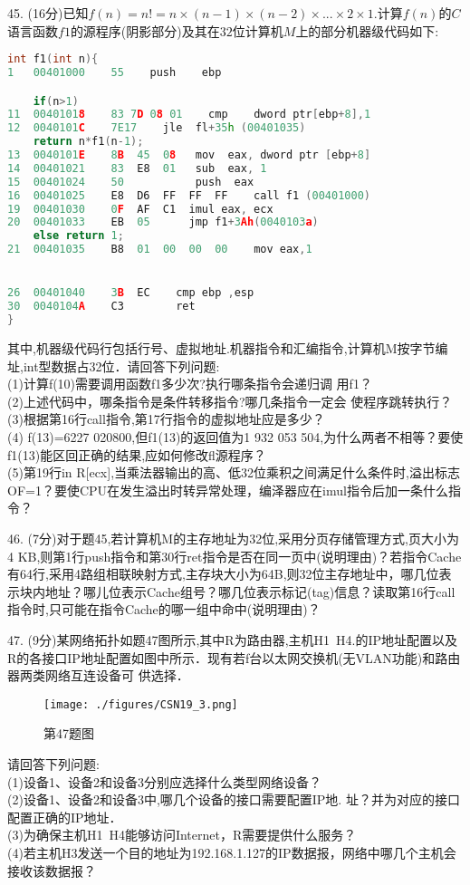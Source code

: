 45. (16分)已知$f(n)=n!=n\times(n-1)\times(n-2)\times...\times2\times1$.计算$f(n)$的$C$语言函数$f1$的源程序(阴影部分)及其在$32$位计算机$M$上的部分机器级代码如下:
\begin{lstlisting}[language=cpp]
int f1(int n){
1   00401000    55    push    ebp

    if(n>1)
11  00401018    83 7D 08 01    cmp    dword ptr[ebp+8],1
12  0040101C    7E17    jle  fl+35h (00401035)
    return n*f1(n-1);
13  0040101E    8B  45  08   mov  eax, dword ptr [ebp+8]
14  00401021    83  E8  01   sub  eax, 1
15  00401024    50           push  eax
16  00401025    E8  D6  FF  FF  FF    call f1 (00401000)
19  00401030    0F  AF  C1  imul eax, ecx
20  00401033    EB  05      jmp f1+3Ah(0040103a)
    else return 1;
21  00401035    B8  01  00  00  00    mov eax,1


26  00401040    3B  EC    cmp ebp ,esp
30  0040104A    C3        ret
}
\end{lstlisting}
其中,机器级代码行包括行号、虚拟地址.机器指令和汇编指令,计算机M按字节编址,int型数据占32位．请回答下列问题: \\
(1)计算f(10)需要调用函数f1多少次?执行哪条指令会递归调
用f1？ \\
(2)上述代码中，哪条指令是条件转移指令?哪几条指令一定会
使程序跳转执行？  \\
(3)根据第16行call指令,第17行指令的虚拟地址应是多少？ \\
(4) f(13)=6227 020800,但f1(13)的返回值为1 932 053 504,为什么两者不相等？要使f1(13)能区回正确的结果,应如何修改fl源程序？ \\
(5)第19行in
R[ecx],当乘法器输出的高、低32位乘积之间满足什么条件时,溢出标志OF=1？要使CPU在发生溢出时转异常处理，编泽器应在imul指令后加一条什么指令？

46. (7分)对于题45,若计算机M的主存地址为32位,采用分页存储管理方式,页大小为4 KB,则第1行push指令和第30行ret指令是否在同一页中(说明理由)？若指令Cache有64行,采用4路组相联映射方式,主存块大小为64B,则32位主存地址中，哪几位表示块内地址？哪儿位表示Cache组号？哪几位表示标记(tag)信息？读取第16行call指令时,只可能在指令Cache的哪一组中命中(说明理由)？

47. (9分)某网络拓扑如题47图所示,其中R为路由器,主机H1~H4.的IP地址配置以及R的各接口IP地址配置如图中所示．现有若f台以太网交换机(无VLAN功能)和路由器两类网络互连设备可
供选择． \\
\begin{figure}[ht]
\centering
\texttt{[image: ./figures/CSN19\_3.png]}
\caption{第47题图} \label{CSN19_fig3}
\end{figure}
请回答下列问题: \\
(1)设备1、设备2和设备3分别应选择什么类型网络设备？  \\
(2)设备1、设备2和设备3中,哪几个设备的接口需要配置IP地.
址？并为对应的接口配置正确的IP地址． \\
(3)为确保主机H1~H4能够访问Internet，R需要提供什么服务？ \\
(4)若主机H3发送一个目的地址为192.168.1.127的IP数据报，网络中哪几个主机会接收该数据报？

